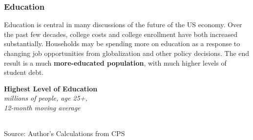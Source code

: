 \documentclass{report}
\newcommand{\tbllink}[1]{\href{https://raw.githubusercontent.com/bdecon/US-chartbook/master/chartbook/data/#1}{\faTable}}
\newcommand{\barylab}[2]{yticklabel style={text width=#1, align=right, 
		style={black!70}, text height=#2},}
\newcommand{\bbar}[2]{extra #1 ticks = {{#2}}, extra #1 tick labels = ,
		extra #1 tick style = {grid=major, grid style={thick, black!25}},}
\newcommand{\barplotnogrid}{xbar=0pt, axis line style={draw=none},
	    yticklabel style={align=left, anchor=east},
      		xmajorticks=false, ymajorgrids=false,   
	    ytick=data, tickwidth=0pt, area legend, reverse legend,
	    nodes near coords align={horizontal},}
\begin{document}
{\begin{minipage}{0.76\textwidth}
\subsubsection*{Education}
\small Education is central in many discussions of the future of the US economy. Over the past few decades, college costs and college enrollment have both increased substantially. Households may be spending more on education as a response to changing job opportunities from globalization and other policy decisions. The end result is a much \textbf{more-educated population}, with much higher levels of student debt.
\end{minipage}
\vspace{1mm}

\begin{minipage}{0.35\textwidth}
\small  
\end{minipage}\hspace{6mm}
\begin{minipage}{0.36\textwidth}
\normalsize \textbf{Highest Level of Education}\\
\footnotesize{\textit{millions of people, age 25+, }}\\
\footnotesize{\textit{12-month moving average}}\\
\hspace*{-4mm} \\
\footnotesize{Source: Author's Calculations from CPS} \hfill \tbllink{cps_educ_tot.csv}
\end{minipage}
\vspace{1mm}

\begin{minipage}{0.76\textwidth}
\small 


\end{minipage}}
\end{document}
